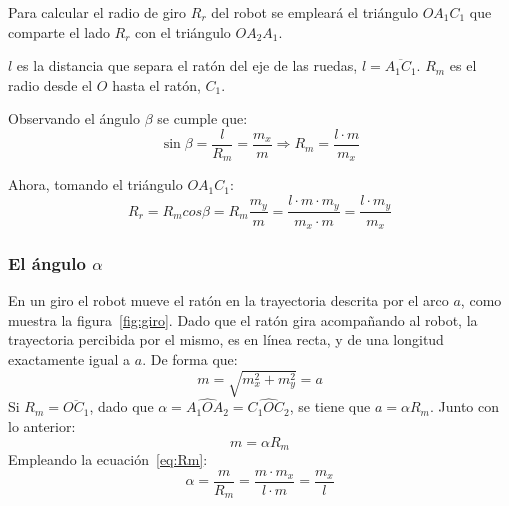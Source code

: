 \documentclass[10pt,a4paper,hidelinks,twocolumn,nobalancelastpage]{article}
\begin{document}
\begin{figure}[h]
\end{figure}
Para calcular el radio de giro $R_r$ del robot se empleará el triángulo 
$OA_1C_1$ que comparte el lado $R_r$ con el triángulo $OA_2A_1$.

$l$ es la distancia que separa el ratón del eje de las ruedas, $l = 
\overline{A_1C_1}$. $R_m$ es el radio desde el $O$ hasta el ratón, $C_1$.

Observando el ángulo $\beta$ se cumple que:
\begin{equation}
	\sin \beta = \frac{l}{R_m} = \frac{m_x}{m} \Longrightarrow
		R_m = \frac{l \cdot m}{m_x}
\label{eq:Rm}
\end{equation}

Ahora, tomando el triángulo $OA_1C_1$:
\begin{equation}
	R_r = R_m cos \beta = R_m \frac{m_y}{m} =
		\frac{l \cdot m \cdot m_y}{m_x \cdot m} =
		\frac{l \cdot m_y}{m_x}
\label{eq:Rr}
\end{equation}
\subsubsection{El ángulo $\alpha$}
En un giro el robot mueve el ratón en la trayectoria descrita por el arco $a$, 
como muestra la figura~\ref{fig:giro}. Dado que el ratón gira acompañando al 
robot, la trayectoria percibida por el mismo, es en línea recta, y de una 
longitud exactamente igual a $a$. De forma que:
$$m = \sqrt{m_x^2 + m_y^2} = a$$
Si $R_m = \overline{OC_1}$, dado que  $\alpha = \widehat{A_1OA_2} = 
\widehat{C_1OC_2}$, se tiene que $a = \alpha R_m$. Junto con lo anterior:
$$ m = \alpha R_m $$
Empleando la ecuación~\ref{eq:Rm}:
\begin{equation}
	\alpha = \frac{m}{R_m} = \frac{m \cdot m_x}{l \cdot m} = \frac{m_x}{l}
	\label{eq:alpha}
\end{equation}
\end{document}

